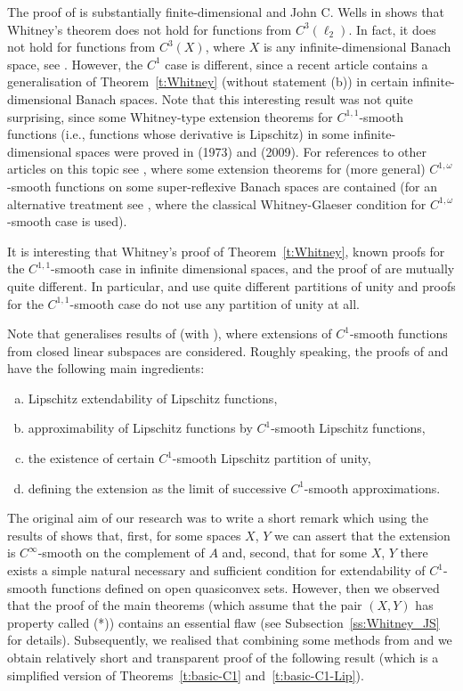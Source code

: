\documentclass[a4paper,twoside,10pt,reqno,draft]{amsart}
\theoremstyle{definition}
\theoremstyle{remark}
\newcommand\om{\omega}
\begin{document}
The proof of \cite[Theorem I]{Wh1} is substantially finite-dimensional and John C. Wells in \cite{We} shows that Whitney's theorem does not hold for functions from $C^3(\ell_2)$.
In fact, it does not hold for functions from $C^3(X)$, where $X$ is any infinite-dimensional Banach space, see \cite{J2}.
However, the $C^1$ case is different, since a recent article \cite{JS1} contains a generalisation of Theorem~\ref{t:Whitney} (without statement (b)) in certain infinite-dimensional Banach spaces.
Note that this interesting result was not quite surprising,
since some Whitney-type extension theorems for $C^{1,1}$-smooth functions (i.e., functions whose derivative is Lipschitz) in some infinite-dimensional spaces were proved in \cite{We} (1973) and \cite{G} (2009).
For references to other articles on this topic see \cite{AM}, where some extension theorems for (more general) $C^{1,\om}$-smooth functions on some super-reflexive Banach spaces are contained
(for an alternative treatment see \cite{JKZ}, where the classical Whitney-Glaeser condition for $C^{1,\om}$-smooth case is used).

It is interesting that Whitney's proof of Theorem~\ref{t:Whitney}, known proofs for the $C^{1,1}$-smooth case in infinite dimensional spaces, and the proof of \cite{JS1} are mutually quite different.
In particular, \cite{Wh1} and \cite{JS1} use quite different partitions of unity and proofs for the $C^{1,1}$-smooth case do not use any partition of unity at all.

Note that \cite{JS1} generalises results of \cite{AFK1} (with \cite{AFK2}), where extensions of $C^1$-smooth functions from closed linear subspaces are considered.
Roughly speaking, the proofs of \cite{AFK1} and \cite{JS1} have the following main ingredients:
\begin{enumerate}[(a)]
\item Lipschitz extendability of Lipschitz functions,
\item approximability of Lipschitz functions by $C^1$-smooth Lipschitz functions,
\item the existence of certain $C^1$-smooth Lipschitz partition of unity,
\item defining the extension as the limit of successive $C^1$-smooth approximations.
\end{enumerate}

The original aim of our research was to write a short remark which using the results of \cite{JS2} shows that, first, for some spaces $X$, $Y$ we can assert that the extension is $C^\infty$-smooth on the complement of $A$
and, second, that for some $X$, $Y$ there exists a simple natural necessary and sufficient condition for extendability of $C^1$-smooth functions defined on open quasiconvex sets.
However, then we observed that the proof of the main theorems \cite[Theorems 3.1 and 3.2]{JS2} (which assume that the pair $(X,Y)$ has property called (*)) contains an essential flaw
(see Subsection~\ref{ss:Whitney_JS} for details).
Subsequently, we realised that combining some methods from \cite{HJ1} and \cite{JS1} we obtain relatively short and transparent proof of the following result
(which is a simplified version of Theorems~\ref{t:basic-C1} and~\ref{t:basic-C1-Lip}).
\end{document}
